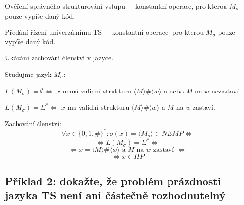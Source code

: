 \begin{compactitem}
\begin{compactenum}
        \item Ověření správného strukturování vstupu~--~konstantní operace, pro kterou $M_{\sigma}$ pouze vypíše daný kód.

        \item Předání řízení univerzálnímu TS~--~konstantní operace, pro kterou $M_{\sigma}$ pouze vypíše daný kód.
    \end{compactenum}

    \item Ukázání zachování členství v jazyce. \begin{compactitem}
        \item Studujme jazyk $M_{\sigma}$: \begin{compactitem}
            \item $L(M_{\sigma}) = \emptyset \Leftrightarrow$ $x$ nemá validní strukturu $\langle M \rangle \# \langle w \rangle$ a nebo $M$ na $w$ nezastaví.

            \item $L(M_{\sigma}) = \Sigma^* \Leftrightarrow$ $x$ má validní strukturu $\langle M \rangle \# \langle w \rangle$ a $M$ na $w$ zastaví.
        \end{compactitem}
        \item Zachování členství:
        $$ \forall x \in \{ 0, 1, \# \}^* : \sigma(x) = \langle M_{\sigma} \rangle \in NEMP \Leftrightarrow $$
        $$ \Leftrightarrow L(M_{\sigma}) = \Sigma^* \Leftrightarrow $$
        $$ \Leftrightarrow x = \langle M \rangle \# \langle w \rangle \text{ a } M \text{ na } w \text{ zastaví } \Leftrightarrow $$
        $$ \Leftrightarrow x \in HP $$
    \end{compactitem}

\end{compactitem}

\subsection*{Příklad 2: dokažte, že problém prázdnosti jazyka TS není ani částečně rozhodnutelný}

